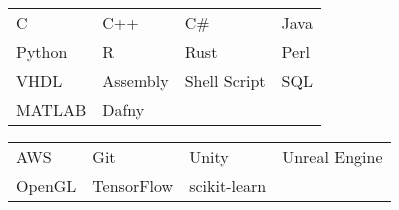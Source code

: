 \documentclass[paper=a4,fontsize=10pt]{resume}
\begin{document}
{		\medskip\normalsize

		\begin{tabular}{llll}
			C & C++ & C\# & Java \\
			Python & R & Rust & Perl \\
			VHDL & Assembly & Shell Script & SQL \\
			MATLAB & Dafny
		\end{tabular}

		\medskip\normalsize

		\begin{tabular}{llll}
			AWS & Git & Unity & Unreal Engine \\
			OpenGL & TensorFlow & scikit-learn
		\end{tabular}
}
\end{document}
